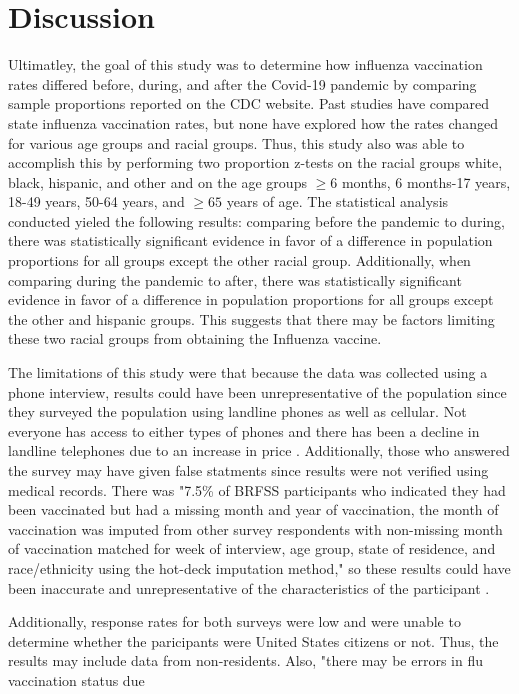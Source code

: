 \documentclass[12pt]{article}
\begin{document}
\section{Discussion}
\label{sec:Discussion}
Ultimatley, the goal of this study was to determine how influenza vaccination rates differed before, during, and after the Covid-19 pandemic by comparing sample proportions reported on the CDC website. Past studies have compared
state influenza vaccination rates, but none have explored how the rates changed for various age groups and racial groups. Thus, this study also was able to accomplish this by performing two proportion z-tests on the racial groups
white, black, hispanic, and other and on the age groups $\ge 6$ months, 6 months-17 years, 18-49 years, 50-64 years, and $\ge 65$ years of age. The statistical analysis conducted yieled the following results: comparing before the
pandemic to during, there was statistically significant evidence in favor of a difference in population proportions for all groups except the other racial group. Additionally, when comparing during the pandemic to after, there was
statistically significant evidence in favor of a difference in population proportions for all groups except the other and hispanic groups. This suggests that there may be factors limiting these two racial groups from obtaining the Influenza
vaccine. \par
The limitations of this study were that because the data was collected using a phone interview, results could have been unrepresentative of the population since they surveyed the population using landline phones as well as cellular.
Not everyone has access to either types of phones and there has been a decline in landline telephones due to an increase in price \citep{boland2006emerging}. Additionally, those who answered the survey may have given false statments since
results were not verified using medical records. There was "7.5\% of BRFSS participants who indicated they had been vaccinated but had a missing month and year of vaccination, the month of vaccination was imputed from other survey respondents 
with non-missing month of vaccination matched for week of interview, age group, state of residence, and race/ethnicity using the hot-deck imputation method," so these results could have been inaccurate and unrepresentative of the characteristics of the
participant \citep{cdc_2021}. \par
Additionally, response rates for both surveys were low and were unable to determine whether the paricipants were United States citizens or not. Thus, the results may include data from non-residents. Also, "there may be errors in flu vaccination status due 
\end{document}
